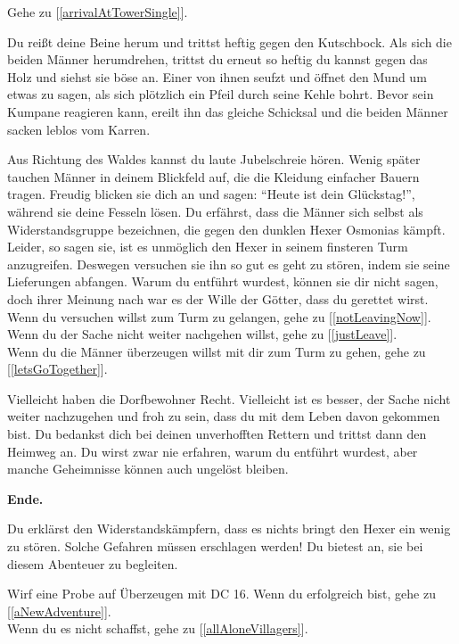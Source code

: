 Gehe zu [\ref{arrivalAtTowerSingle}].


Du reißt deine Beine herum und trittst heftig gegen den Kutschbock. Als sich die beiden Männer herumdrehen, trittst du erneut so heftig du kannst gegen das Holz und siehst sie böse an. Einer von ihnen seufzt und öffnet den Mund um etwas zu sagen, als sich plötzlich ein Pfeil durch seine Kehle bohrt. Bevor sein Kumpane reagieren kann, ereilt ihn das gleiche Schicksal und die beiden Männer sacken leblos vom Karren.

Aus Richtung des Waldes kannst du laute Jubelschreie hören. Wenig später tauchen Männer in deinem Blickfeld auf, die die Kleidung einfacher Bauern tragen. Freudig blicken sie dich an und sagen: ``Heute ist dein Glückstag!'', während sie deine Fesseln lösen. Du erfährst, dass die Männer sich selbst als Widerstandsgruppe bezeichnen, die gegen den dunklen Hexer Osmonias kämpft. Leider, so sagen sie, ist es unmöglich den Hexer in seinem finsteren Turm anzugreifen. Deswegen versuchen sie ihn so gut es geht zu stören, indem sie seine Lieferungen abfangen. Warum du entführt wurdest, können sie dir nicht sagen, doch ihrer Meinung nach war es der Wille der Götter, dass du gerettet wirst.
\\Wenn du versuchen willst zum Turm zu gelangen, gehe zu [\ref{notLeavingNow}].
\\Wenn du der Sache nicht weiter nachgehen willst, gehe zu [\ref{justLeave}].
\\Wenn du die Männer überzeugen willst mit dir zum Turm zu gehen, gehe zu [\ref{letsGoTogether}].


Vielleicht haben die Dorfbewohner Recht. Vielleicht ist es besser, der Sache nicht weiter nachzugehen und froh zu sein, dass du mit dem Leben davon gekommen bist. Du bedankst dich bei deinen unverhofften Rettern und trittst dann den Heimweg an. Du wirst zwar nie erfahren, warum du entführt wurdest, aber manche Geheimnisse können auch ungelöst bleiben.

\textbf{Ende.}


Du erklärst den Widerstandskämpfern, dass es nichts bringt den Hexer ein wenig zu stören. Solche Gefahren müssen erschlagen werden! Du bietest an, sie bei diesem Abenteuer zu begleiten.

Wirf eine Probe auf Überzeugen mit DC 16. Wenn du erfolgreich bist, gehe zu [\ref{aNewAdventure}].
\\Wenn du es nicht schaffst, gehe zu [\ref{allAloneVillagers}].

